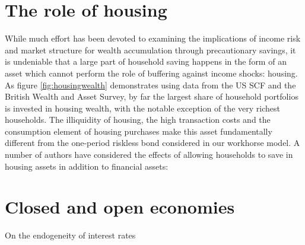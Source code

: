 \section{The role of housing}\label{housing}
While much effort has been devoted to examining the implications of income risk
and market structure for wealth accumulation through precautionary savings, it 
is undeniable that a large part of household saving happens in the form of an
asset which cannot perform the role of buffering against income shocks: housing.
As figure \ref{fig:housingwealth} demonstrates using data from the US SCF and
the British Wealth and Asset Survey, by far the largest share of household
portfolios is invested in housing wealth, with the notable exception of the
very richest households. The illiquidity of housing, the high transaction costs
and the consumption element of housing purchases make this asset fundamentally
different from the one-period riskless bond considered in our workhorse model.
A number of authors have considered the effects of allowing households to save
in housing assets in addition to financial assets: \citet{CampbellHercovitz} 




\citet{CampbellHercovitz2005}
\citet{Yang2009}
\citet{Iacoviello2008}

\section{Closed and open economies}
On the endogeneity of interest rates

